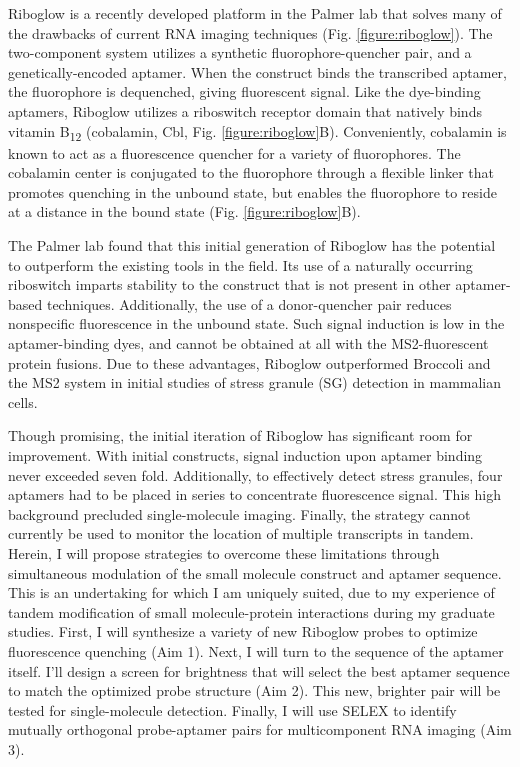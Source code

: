 Riboglow is a recently developed platform in the Palmer lab that solves many of the drawbacks of current RNA imaging techniques (Fig. \ref{figure:riboglow}). The two-component system utilizes a synthetic fluorophore-quencher pair, and a genetically-encoded aptamer. When the construct binds the transcribed aptamer, the fluorophore is dequenched, giving fluorescent signal. Like the dye-binding aptamers, Riboglow utilizes a riboswitch receptor domain that natively binds vitamin B\textsubscript{12} (cobalamin, Cbl, Fig. \ref{figure:riboglow}B).\cite{JohnsonJrB12cofactorsdirectly2012} Conveniently, cobalamin is known to act as a fluorescence quencher for a variety of fluorophores.\cite{RosendahlSynthesisbiologicalactivity1982,LeeDesignSynthesisCharacterization2009,SmeltzerSynthesisCharacterizationFluorescent2001} The cobalamin center is conjugated to the fluorophore through a flexible linker that promotes quenching in the unbound state, but enables the fluorophore to reside at a distance in the bound state (Fig. \ref{figure:riboglow}B).

The Palmer lab found that this initial generation of Riboglow has the potential to outperform the existing tools in the field. Its use of a naturally occurring riboswitch imparts stability to the construct that is not present in other aptamer-based techniques. Additionally, the use of a donor-quencher pair reduces nonspecific fluorescence in the unbound state. Such signal induction is low in the aptamer-binding dyes, and cannot be obtained at all with the MS2-fluorescent protein fusions. Due to these advantages, Riboglow outperformed Broccoli and the MS2 system in initial studies of stress granule (SG) detection in mammalian cells.

Though promising, the initial iteration of Riboglow has significant room for improvement. With initial constructs, signal induction upon aptamer binding never exceeded seven fold. Additionally, to effectively detect stress granules, four aptamers had to be placed in series to concentrate fluorescence signal. This high background precluded single-molecule imaging. Finally, the strategy cannot currently be used to monitor the location of multiple transcripts in tandem. Herein, I will propose strategies to overcome these limitations through simultaneous modulation of the small molecule construct and aptamer sequence. This is an undertaking for which I am uniquely suited, due to my experience of tandem modification of small molecule-protein interactions during my graduate studies. First, I will synthesize a variety of new Riboglow probes to optimize fluorescence quenching (Aim 1). Next, I will turn to the sequence of the aptamer itself. I'll design a screen for brightness that will select the best aptamer sequence to match the optimized probe structure (Aim 2). This new, brighter pair will be tested for single-molecule detection. Finally, I will use SELEX to identify mutually orthogonal probe-aptamer pairs for multicomponent RNA imaging (Aim 3).

